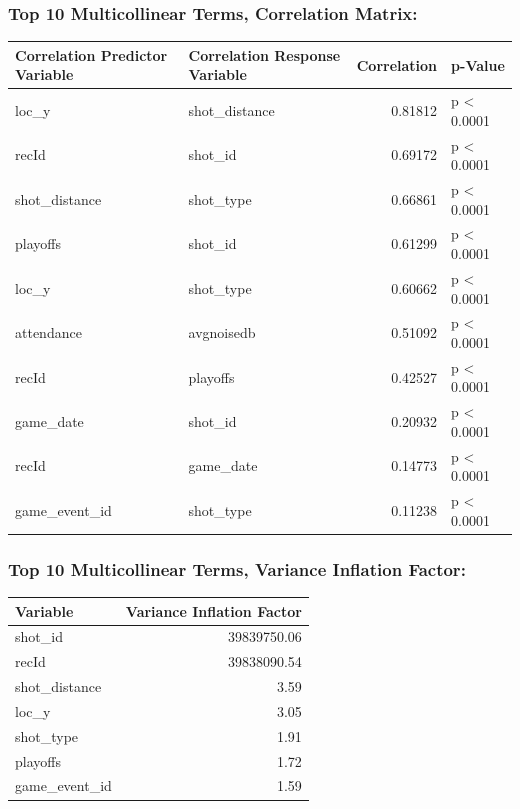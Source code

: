 \documentclass[american,]{article}
\begin{document}
\hypertarget{top-10-multicollinear-terms-correlation-matrix}{%
\subsubsection{\texorpdfstring{\textbf{Top 10 Multicollinear Terms, Correlation Matrix:}}{Top 10 Multicollinear Terms, Correlation Matrix:}}\label{top-10-multicollinear-terms-correlation-matrix}}

\begin{table}[H]
\centering
\begin{tabular}{llrl}
\toprule
Correlation Predictor Variable & Correlation Response Variable & Correlation & p-Value\\
\midrule
\rowcolor{gray!6}  loc\_y & shot\_distance & 0.81812 & p < 0.0001\\
recId & shot\_id & 0.69172 & p < 0.0001\\
\rowcolor{gray!6}  shot\_distance & shot\_type & 0.66861 & p < 0.0001\\
playoffs & shot\_id & 0.61299 & p < 0.0001\\
\rowcolor{gray!6}  loc\_y & shot\_type & 0.60662 & p < 0.0001\\
\addlinespace
attendance & avgnoisedb & 0.51092 & p < 0.0001\\
\rowcolor{gray!6}  recId & playoffs & 0.42527 & p < 0.0001\\
game\_date & shot\_id & 0.20932 & p < 0.0001\\
\rowcolor{gray!6}  recId & game\_date & 0.14773 & p < 0.0001\\
game\_event\_id & shot\_type & 0.11238 & p < 0.0001\\
\bottomrule
\end{tabular}
\end{table}

\hypertarget{top-10-multicollinear-terms-variance-inflation-factor}{%
\subsubsection{\texorpdfstring{\textbf{Top 10 Multicollinear Terms, Variance Inflation Factor:}}{Top 10 Multicollinear Terms, Variance Inflation Factor:}}\label{top-10-multicollinear-terms-variance-inflation-factor}}

\begin{table}[H]
\centering
\begin{tabular}{lr}
\toprule
Variable & Variance Inflation Factor\\
\midrule
\rowcolor{gray!6}  shot\_id & 39839750.06\\
recId & 39838090.54\\
\rowcolor{gray!6}  shot\_distance & 3.59\\
loc\_y & 3.05\\
\rowcolor{gray!6}  shot\_type & 1.91\\
\addlinespace
playoffs & 1.72\\
\rowcolor{gray!6}  game\_event\_id & 1.59\\
\bottomrule
\end{tabular}
\end{table}
\end{document}
